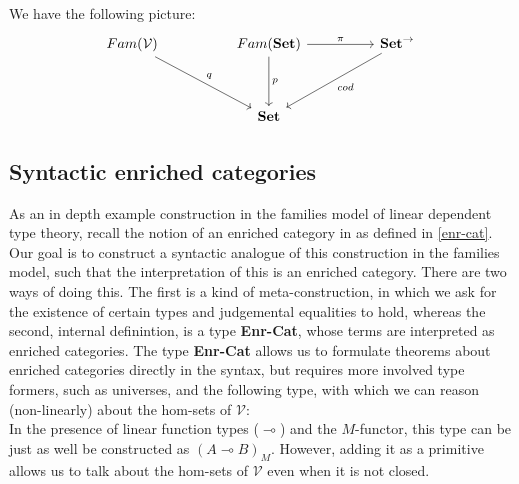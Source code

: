 We have the following picture:
\[
\ti
Fam(\mathcal{V}) \ar[rd, "q"]  & Fam(\mathbf{Set}) \ar[d, "p"] \ar[r, "\pi"] & \mathbf{Set}^\to \ar[ld, "cod"] \\
& \mathbf{Set}
\kz
\]

\subsection{Syntactic enriched categories}
As an in depth example construction in the families model of linear dependent type theory, recall the notion of an enriched category in as defined in \ref{enr-cat}.
Our goal is to construct a syntactic analogue of this construction in the families model, such that the interpretation of this is an enriched category. There are two ways of doing this. The first is a kind of meta-construction, in which we ask for the existence of certain types and judgemental equalities to hold, whereas the second, internal definintion, is a type \textbf{Enr-Cat}, whose terms are interpreted as enriched categories. The type \textbf{Enr-Cat} allows us to formulate theorems about enriched categories directly in the syntax, but requires more involved type formers, such as universes, and the following type,
with which we can reason (non-linearly) about the hom-sets of $\mathcal{V}$:\\
In the presence of linear function types ($\multimap$) and the $M$-functor, this type can be just as well be constructed as $(A \multimap B)_M$. However, adding it as a primitive allows us to talk about the hom-sets of $\mathcal{V}$ even when it is not closed.\\
